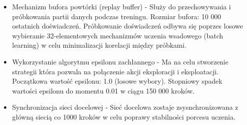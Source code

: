 \documentclass[a4paper, 12pt]{article}
\begin{document}
\begin{itemize}
        \item Mechanizm bufora powtórki (replay buffer) - Służy do przechowywania i próbkowania partii danych podczas treningu. Rozmiar bufora: 10 000 ostatnich doświadczeń.
        Próbkowanie doświadczeń odbywa się poprzes losowe wybieranie 32-elementowych mechanizmów uczenia wsadowego (batch learning) w celu minimalizacji korelacji między próbkami.
        \item Wykorzystanie algorytmu epsilonu zachłannego - Ma na celu stworzenie strategii która pozwala na połączenie akcji eksploracji i eksploatacji. Początkowa wartość epsilonu: 1.0
        (losowe wybory). Stopniowy spadek wartości epsilonu do momentu 0.01 w ciągu 150 000 kroków.
        \item Synchronizacja sieci docelowej - Sieć docelowa zostaje zsysnchronizowana z główną siecią co 1000 kroków w celu poprawy stabilności porcesu uczenia.
    \end{itemize}
\end{document}
